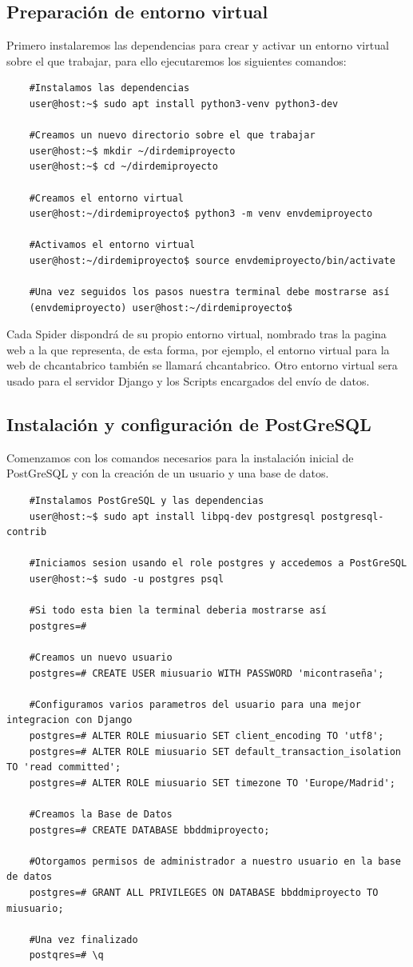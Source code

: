 \subsection{Preparación de entorno virtual}
Primero instalaremos las dependencias para crear y activar un entorno virtual sobre el que trabajar, para ello ejecutaremos los siguientes comandos:

\begin{verbatim}
	#Instalamos las dependencias
	user@host:~$ sudo apt install python3-venv python3-dev
	
	#Creamos un nuevo directorio sobre el que trabajar
	user@host:~$ mkdir ~/dirdemiproyecto
	user@host:~$ cd ~/dirdemiproyecto
	
	#Creamos el entorno virtual
	user@host:~/dirdemiproyecto$ python3 -m venv envdemiproyecto
	
	#Activamos el entorno virtual
	user@host:~/dirdemiproyecto$ source envdemiproyecto/bin/activate
	
	#Una vez seguidos los pasos nuestra terminal debe mostrarse así
	(envdemiproyecto) user@host:~/dirdemiproyecto$
\end{verbatim}

Cada Spider dispondrá de su propio entorno virtual, nombrado tras la pagina web a la que representa, de esta forma, por ejemplo, el entorno virtual para la web de chcantabrico también se llamará chcantabrico.
Otro entorno virtual sera usado para el servidor Django y los Scripts encargados del envío de datos.

\subsection{Instalación y configuración de PostGreSQL}
Comenzamos con los comandos necesarios para la instalación inicial de PostGreSQL y con la creación de un usuario y una base de datos.

\begin{verbatim}
	#Instalamos PostGreSQL y las dependencias
	user@host:~$ sudo apt install libpq-dev postgresql postgresql-contrib
	
	#Iniciamos sesion usando el role postgres y accedemos a PostGreSQL
	user@host:~$ sudo -u postgres psql
	
	#Si todo esta bien la terminal deberia mostrarse así
	postgres=# 
	
	#Creamos un nuevo usuario
	postgres=# CREATE USER miusuario WITH PASSWORD 'micontraseña';
	
	#Configuramos varios parametros del usuario para una mejor integracion con Django
	postgres=# ALTER ROLE miusuario SET client_encoding TO 'utf8';
	postgres=# ALTER ROLE miusuario SET default_transaction_isolation TO 'read committed';
	postgres=# ALTER ROLE miusuario SET timezone TO 'Europe/Madrid';
	
	#Creamos la Base de Datos
	postgres=# CREATE DATABASE bbddmiproyecto;
	
	#Otorgamos permisos de administrador a nuestro usuario en la base de datos
	postgres=# GRANT ALL PRIVILEGES ON DATABASE bbddmiproyecto TO miusuario;
	
	#Una vez finalizado
	postqres=# \q
	
\end{verbatim}

